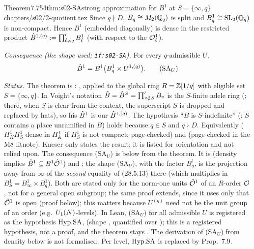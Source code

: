 \begin{quoted}{Theorem}{7.7}{54}{thm:s02-SA}{strong approximation for $B^1$ at $S=\{\infty,q\}$}{chapters/s02/2-quotient.tex}\label{rpt:thm:s02-SA}
Since $q\nmid D$, $B_q\cong M_2(\mathbb{Q}_q)$ is split and $B^1_q\cong\mathrm{SL}_2(\mathbb{Q}_q)$ is non-compact. Hence $B^1$ (embedded diagonally) is
dense in the restricted product $\hat{B}^{1,(q)}:=\prod'_{\ell\ne q}B^1_\ell$ (with respect to the $\mathcal{O}^1_\ell$).
\smallskip

\noindent\emph{Consequence (the shape used; \texttt{if:s02-SA}).} For every $q$-admissible $U$,
\[\hat{B}^1=B^1\big(B^1_q\times U^{1,(q)}\big).\tag{SA$_U$}\]
\par\smallskip{}\par
\noindent\emph{Status.} The theorem is \stcited{}:
\cite[Main Thm.~28.5.3, p.~485]{Vo}, applied to the global ring $R=\mathbb{Z}[1/q]$ with eligible set
$S=\{\infty,q\}$. In Voight's notation $\hat{B}=\hat{B}^S=\prod'_{v\notin S}B_v$ is the $S$-finite adele ring
(\cite[27.6.4, p.~469]{Vo}; there, when $S$ is clear from the context, the superscript $S$ is dropped and replaced by hats), so his
$\hat{B}^1$ is our $\hat{B}^{1,(q)}$. The hypothesis ``$B$ is $S$-indefinite'' (\cite[Def.~28.5.1,
p.~485]{Vo}: $S$ contains a place unramified in $B$) holds because $q\in S$ and $q\nmid D$.
Equivalently \cite[Ch.~III, Thm.~4.3, p.~81]{Vigneras1980} ($H^1_KH^1_S$ dense in
$H^1_{\mathbb{A}}$ if $H^1_S$ is not compact; page-checked) and
\cite[\S7.4, Thm.~7.12, p.~427]{PlatonovRapinchuk1994} (page-checked in the M8 litnote).
Kneser \cite[\S5.5, Sublemma~b, p.~94 (Tata pagination; p.~72 of the scan)]{Kneser1969} only states the result;
it is listed for orientation and not relied upon. The consequence (SA$_U$) is \stproved{} below from the theorem. It is
\cite[28.4.8, p.~484]{Vo} (density implies $\hat{B}^1\subseteq B^1\hat{\mathcal{O}}^1$) and
\cite[Cor.~28.5.12, p.~486]{Vo}; the shape (SA$_U$), with the factor $B^1_q$, is the projection away from $\infty$ of the \emph{second}
equality of (28.5.13) there (which multiplies in $B^1_S=B^1_\infty\times B^1_q$). Both are stated only for the norm-one units $\hat{\mathcal{O}}^1$ of an
$R$-order $\mathcal{O}$, not for a general open subgroup; the same proof extends, since it uses only that $\hat{\mathcal{O}}^1$ is open (proof below); this matters because $U^{(q)}$ need not be the unit group of an order (e.g.\ $U_1(N)$-levels).
In Lean, (SA$_U$) for all admissible $U$ is registered as the hypothesis $\mathrm{Hyp.SA}$,  (shape
, quantified over ); this is a registered hypothesis, not a proof, and the
theorem stays \stcited. The derivation of (SA$_U$) from density below is not formalised. Per level, $\mathrm{Hyp.SA}$ is replaced by
Prop.~7.9.
\end{quoted}
